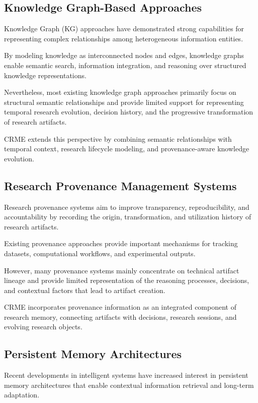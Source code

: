 \subsection{Knowledge Graph-Based Approaches}

Knowledge Graph (KG) approaches have demonstrated strong capabilities for representing complex relationships among heterogeneous information entities.

By modeling knowledge as interconnected nodes and edges, knowledge graphs enable semantic search, information integration, and reasoning over structured knowledge representations.

Nevertheless, most existing knowledge graph approaches primarily focus on structural semantic relationships and provide limited support for representing temporal research evolution, decision history, and the progressive transformation of research artifacts.

CRME extends this perspective by combining semantic relationships with temporal context, research lifecycle modeling, and provenance-aware knowledge evolution.


\subsection{Research Provenance Management Systems}

Research provenance systems aim to improve transparency, reproducibility, and accountability by recording the origin, transformation, and utilization history of research artifacts.

Existing provenance approaches provide important mechanisms for tracking datasets, computational workflows, and experimental outputs.

However, many provenance systems mainly concentrate on technical artifact lineage and provide limited representation of the reasoning processes, decisions, and contextual factors that lead to artifact creation.

CRME incorporates provenance information as an integrated component of research memory, connecting artifacts with decisions, research sessions, and evolving research objects.


\subsection{Persistent Memory Architectures}

Recent developments in intelligent systems have increased interest in persistent memory architectures that enable contextual information retrieval and long-term adaptation.

